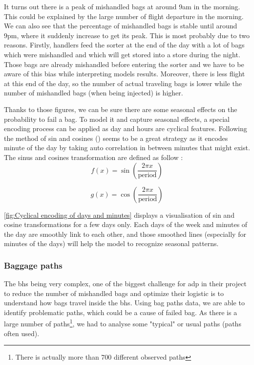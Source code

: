 \documentclass[12pt]{article}
\begin{document}
It turns out there is a peak of mishandled bags at around 9am in the morning. This could be explained by the large number of flight departure in the morning. We can also see that the percentage of mishandled bags is stable until around 9pm, where it suddenly increase to get its peak. This is most probably due to two reasons. Firstly, handlers feed the sorter at the end of the day with a lot of bags which were mishandled and which will get stored into a store during the night. Those bags are already mishandled before entering the sorter and we have to be aware of this bias while interpreting models results. Moreover, there is less flight at this end of the day, so the number of actual traveling bags is lower while the number of mishandled bags (when being injected) is higher.

\indent Thanks to those figures, we can be sure there are some seasonal effects on the probability to fail a bag. To model it and capture seasonal effects, a special encoding process can be applied as day and hours are cyclical features. Following the method of sin and cosines (\cite{HarrisonPim}) seems to be a great strategy as it encodes minute of the day by taking auto correlation in between minutes that might exist.
\noindent The sinus and cosines transformation are defined as follow : 
\begin{equation}
f(x) = \sin\left(\frac{2\pi x}{\text{period}}\right)
\end{equation}

\begin{equation}
g(x) = \cos\left(\frac{2\pi x}{\text{period}}\right)
\end{equation}

\autoref{fig:Cyclical encoding of days and minutes} displays a visualisation of sin and cosine transformations for a few days only. Each days of the week and minutes of the day are smoothly link to each other, and those smoothed lines (especially for minutes of the days) will help the model to recognize seasonal patterns.  

\FloatBarrier

\newpage
\subsubsection{Baggage paths}

The \acrlong{bhs} being very complex, one of the biggest challenge for \acrshort{adp} in their project to reduce the number of mishandled bags and optimize their logistic is to understand how bags travel inside the \acrshort{bhs}. Using bag paths data, we are able to identify problematic paths, which could be a cause of failed bag. As there is a large number of paths\footnote{There is actually more than 700 different observed paths}, we had to analyse some "typical" or usual paths (paths often used).
\end{document}
